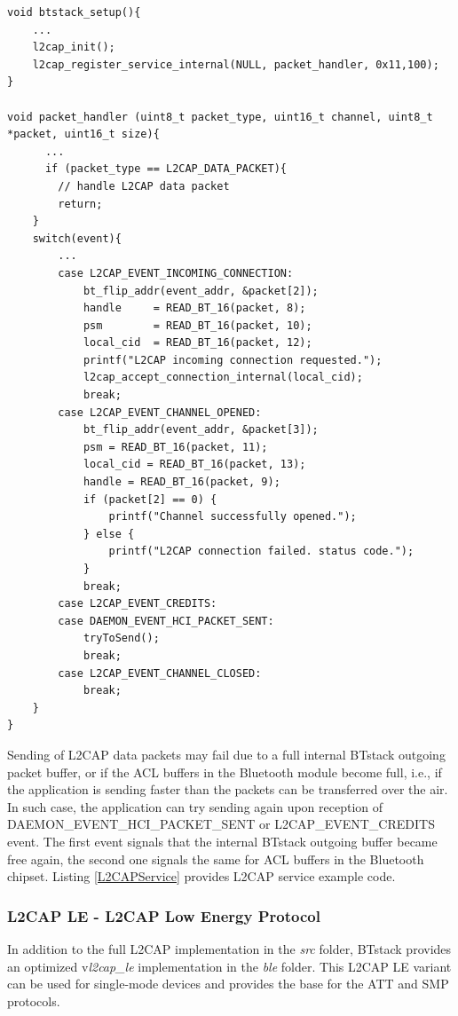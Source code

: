 \begin{lstlisting}[caption=Providing an L2CAP service., label=L2CAPService]
void btstack_setup(){
    ...
    l2cap_init();
    l2cap_register_service_internal(NULL, packet_handler, 0x11,100);
}

void packet_handler (uint8_t packet_type, uint16_t channel, uint8_t *packet, uint16_t size){
      ...
      if (packet_type == L2CAP_DATA_PACKET){
        // handle L2CAP data packet
        return;
    }
    switch(event){
        ...
        case L2CAP_EVENT_INCOMING_CONNECTION:
            bt_flip_addr(event_addr, &packet[2]);
            handle     = READ_BT_16(packet, 8); 
            psm        = READ_BT_16(packet, 10); 
            local_cid  = READ_BT_16(packet, 12); 
            printf("L2CAP incoming connection requested.");
            l2cap_accept_connection_internal(local_cid);
            break;
        case L2CAP_EVENT_CHANNEL_OPENED:
            bt_flip_addr(event_addr, &packet[3]);
            psm = READ_BT_16(packet, 11); 
            local_cid = READ_BT_16(packet, 13); 
            handle = READ_BT_16(packet, 9);
            if (packet[2] == 0) {
                printf("Channel successfully opened.");
            } else {
                printf("L2CAP connection failed. status code.");
            }
            break;        
        case L2CAP_EVENT_CREDITS:
        case DAEMON_EVENT_HCI_PACKET_SENT:
            tryToSend();
            break;
        case L2CAP_EVENT_CHANNEL_CLOSED:
            break;
    }
}
\end{lstlisting}

Sending of L2CAP data packets may fail due to a full internal BTstack outgoing packet buffer, or if the ACL buffers in the Bluetooth module become full, i.e., if the application is sending faster than the packets can be transferred over the air. In such case, the application can try sending again upon reception of DAEMON\_EVENT\_HCI\_PACKET\_SENT or L2CAP\_EVENT\_CREDITS event. The first event signals that the internal BTstack outgoing buffer became free again, the second one signals the same for ACL buffers in the Bluetooth chipset. Listing \ref{L2CAPService} provides L2CAP service example code.


\subsubsection{L2CAP LE - L2CAP Low Energy Protocol}
In addition to the full L2CAP implementation in the \emph{src} folder, BTstack provides an optimized v\emph{l2cap\_le} implementation in the \emph{ble} folder. This L2CAP LE variant can be used for single-mode devices and provides the base for the ATT and SMP protocols.



